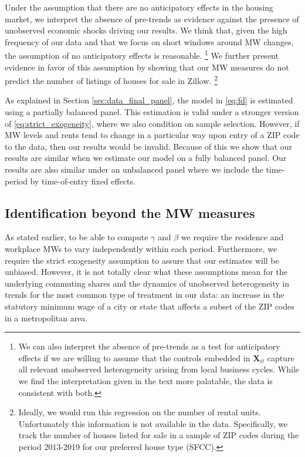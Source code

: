 Under the assumption that there are no anticipatory effects in the housing 
market, we interpret the absence of pre-trends as evidence against the presence 
of unobserved economic shocks driving our results.
We think that, given the high frequency of our data and that we focus on short 
windows around MW changes, the assumption of no anticipatory effects is 
reasonable.%
\footnote{We can also interpret the absence of pre-trends as a test for 
anticipatory effects if we are willing to assume that the controls embedded in 
$\mathbf{X}_{it}$ capture all relevant unobserved heterogeneity arising from 
local business cycles.
While we find the interpretation given in the text more palatable, the data is 
consistent with both.}
We further present evidence in favor of this assumption by showing that our MW 
measures do not predict the number of listings of houses for sale in Zillow.%
\footnote{Ideally, we would run this regression on the number of rental units.
Unfortunately this information is not available in the data.
Specifically, we track the number of houses listed for sale in a sample of ZIP 
codes during the period 2013-2019 for our preferred house type (SFCC).}

As explained in Section \ref{sec:data_final_panel}, 
the model in \eqref{eq:fd} is estimated using a partially balanced panel.
This estimation is valid under a stronger version of 
\eqref{eq:strict_exogeneity}, where we also condition on sample selection.
However, if MW levels and rents tend to change in a particular way upon entry 
of a ZIP code to the data, then our results would be invalid.
Because of this we show that our results are similar when we estimate our model
on a fully balanced panel.
Our results are also similar under an unbalanced panel where we include the 
time-period by time-of-entry fixed effects.

\subsection{Identification beyond the MW measures}

As stated earlier, to be able to compute $\gamma$ and $\beta$ we require the 
residence and workplace MWs to vary independently within each period.
Furthermore, we require the strict exogeneity assumption to assure that our
estimates will be unbiased.
However, it is not totally clear what these assumptions mean for the underlying 
commuting shares and the dynamics of unobserved heterogeneity in trends for the 
most common type of treatment in our data: 
an increase in the statutory minimum wage of a city or state that affects 
a subset of the ZIP codes in a metropolitan area.

